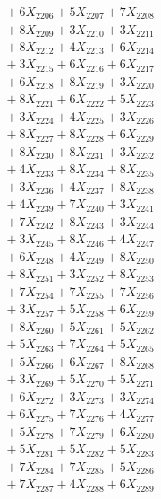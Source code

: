 \documentclass[a4paper,10pt]{article}
\begin{document}
{\begin{align}
&\;  + 6 X_{2206} + 5 X_{2207} + 7 X_{2208} \\[0.3ex]
&\;  + 8 X_{2209} + 3 X_{2210} + 3 X_{2211} \\[0.3ex]
&\;  + 8 X_{2212} + 4 X_{2213} + 6 X_{2214} \\[0.3ex]
&\;  + 3 X_{2215} + 6 X_{2216} + 6 X_{2217} \\[0.3ex]
&\;  + 6 X_{2218} + 8 X_{2219} + 3 X_{2220} \\[0.3ex]
&\;  + 8 X_{2221} + 6 X_{2222} + 5 X_{2223} \\[0.3ex]
&\;  + 3 X_{2224} + 4 X_{2225} + 3 X_{2226} \\[0.3ex]
&\;  + 8 X_{2227} + 8 X_{2228} + 6 X_{2229} \\[0.5ex]\allowbreak
&\;  + 8 X_{2230} + 8 X_{2231} + 3 X_{2232} \\[0.3ex]
&\;  + 4 X_{2233} + 8 X_{2234} + 8 X_{2235} \\[0.3ex]
&\;  + 3 X_{2236} + 4 X_{2237} + 8 X_{2238} \\[0.3ex]
&\;  + 4 X_{2239} + 7 X_{2240} + 3 X_{2241} \\[0.3ex]
&\;  + 7 X_{2242} + 8 X_{2243} + 3 X_{2244} \\[0.3ex]
&\;  + 3 X_{2245} + 8 X_{2246} + 4 X_{2247} \\[0.3ex]
&\;  + 6 X_{2248} + 4 X_{2249} + 8 X_{2250} \\[0.3ex]
&\;  + 8 X_{2251} + 3 X_{2252} + 8 X_{2253} \\[0.3ex]
&\;  + 7 X_{2254} + 7 X_{2255} + 7 X_{2256} \\[0.3ex]
&\;  + 3 X_{2257} + 5 X_{2258} + 6 X_{2259} \\[0.5ex]\allowbreak
&\;  + 8 X_{2260} + 5 X_{2261} + 5 X_{2262} \\[0.3ex]
&\;  + 5 X_{2263} + 7 X_{2264} + 5 X_{2265} \\[0.3ex]
&\;  + 5 X_{2266} + 6 X_{2267} + 8 X_{2268} \\[0.3ex]
&\;  + 3 X_{2269} + 5 X_{2270} + 5 X_{2271} \\[0.3ex]
&\;  + 6 X_{2272} + 3 X_{2273} + 3 X_{2274} \\[0.3ex]
&\;  + 6 X_{2275} + 7 X_{2276} + 4 X_{2277} \\[0.3ex]
&\;  + 5 X_{2278} + 7 X_{2279} + 6 X_{2280} \\[0.3ex]
&\;  + 5 X_{2281} + 5 X_{2282} + 5 X_{2283} \\[0.3ex]
&\;  + 7 X_{2284} + 7 X_{2285} + 5 X_{2286} \\[0.3ex]
&\;  + 7 X_{2287} + 4 X_{2288} + 6 X_{2289} \\[0.5ex]\allowbreak

\end{align}}
\end{document}
